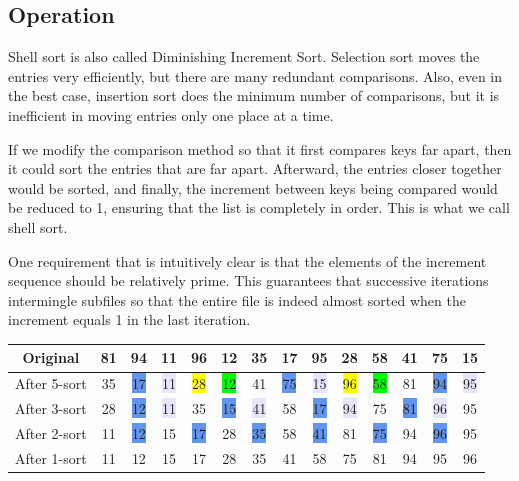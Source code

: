 \subsection{Operation}
Shell sort is also called Diminishing Increment Sort. Selection sort moves the entries very efficiently, but there are many redundant comparisons. Also, even in the best case, insertion sort does the minimum number of comparisons, but it is inefficient in moving entries only one place at a time.

If we modify the comparison method so that it first compares keys far apart, then it could sort the entries that are far apart. Afterward, the entries closer together would be sorted, and finally, the increment between keys being compared would be reduced to 1, ensuring that the list is completely in order. This is what we call shell sort.

One requirement that is intuitively clear is that the elements of the increment sequence should be relatively prime. This guarantees that successive iterations intermingle subfiles so that the entire file is indeed almost sorted when the increment equals 1 in the last iteration.

\begin{table}[H]
  \centering
  \begin{tabular}{c|c c c c c c c c c c c c c}
      \toprule
      Original & 81 & 94 & 11 & 96 & 12 & 35 & 17 & 95 & 28 & 58 & 41 & 75 & 15  \\
    \midrule
      After 5-sort & \colorbox{Apricot}{35} & \colorbox{CornflowerBlue}{17} & \colorbox{Lavender}{11} & \colorbox{yellow}{28} & \colorbox{lime}{12} & \colorbox{Apricot}{41} & \colorbox{CornflowerBlue}{75} & \colorbox{Lavender}{15} & \colorbox{yellow}{96} & \colorbox{lime}{58} & \colorbox{Apricot}{81} & \colorbox{CornflowerBlue}{94} & \colorbox{Lavender}{95}  \\
      After 3-sort & \colorbox{Apricot}{28} & \colorbox{CornflowerBlue}{12} & \colorbox{Lavender}{11} & \colorbox{Apricot}{35} & \colorbox{CornflowerBlue}{15} & \colorbox{Lavender}{41} & \colorbox{Apricot}{58} & \colorbox{CornflowerBlue}{17} & \colorbox{Lavender}{94} & \colorbox{Apricot}{75} & \colorbox{CornflowerBlue}{81} & \colorbox{Lavender}{96} & \colorbox{Apricot}{95}  \\
      After 2-sort & \colorbox{Apricot}{11} & \colorbox{CornflowerBlue}{12} & \colorbox{Apricot}{15} & \colorbox{CornflowerBlue}{17} & \colorbox{Apricot}{28} & \colorbox{CornflowerBlue}{35} & \colorbox{Apricot}{58} & \colorbox{CornflowerBlue}{41} & \colorbox{Apricot}{81} & \colorbox{CornflowerBlue}{75} & \colorbox{Apricot}{94} & \colorbox{CornflowerBlue}{96} & \colorbox{Apricot}{95}  \\
      After 1-sort & \colorbox{Apricot}{11} & \colorbox{Apricot}{12} & \colorbox{Apricot}{15} & \colorbox{Apricot}{17} & \colorbox{Apricot}{28} & \colorbox{Apricot}{35} & \colorbox{Apricot}{41} & \colorbox{Apricot}{58} & \colorbox{Apricot}{75} & \colorbox{Apricot}{81} & \colorbox{Apricot}{94} & \colorbox{Apricot}{95} & \colorbox{Apricot}{96}  \\
      \bottomrule
  \end{tabular}
\end{table}

